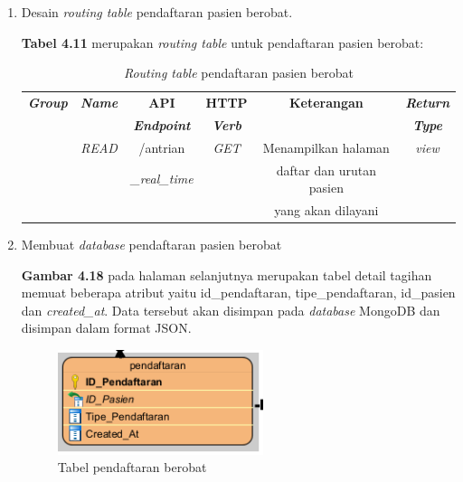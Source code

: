 \begin{enumerate}
	\item Desain \emph{routing table} pendaftaran pasien berobat. 
	
	\textbf{Tabel 4.11} merupakan \emph{routing table} untuk pendaftaran pasien berobat:
	
	\begin{table}[H]
		\centering
		\caption{\emph{Routing table} pendaftaran pasien berobat}
		\label{tabel_input}
		\begin{tabular}{|c|c|c|c|c|c|}
			\hline
			\textbf{\emph{Group}} & \textbf{\emph{Name}} & \textbf{API} & \textbf{HTTP} & \textbf{Keterangan} & \textbf{\emph{Return}} \\
			
			& & \textbf{\emph{Endpoint}} & \textbf{\emph{Verb}} & & \textbf{\emph{Type}} \\
			\hline
			
			& 
			\emph{READ} &
			/antrian&
			\emph{GET} &
			Menampilkan halaman&
			\emph{view}\\
			
			
			& 
			&
			\emph{\_real\_time}&
			&
			daftar dan urutan pasien&\\
			
			& 
			&
			&
			&
			yang akan dilayani &\\
			\hline
			
		\end{tabular}
	\end{table}
	
	\item Membuat \emph{database} pendaftaran pasien berobat
	
	\textbf{Gambar 4.18} pada halaman selanjutnya merupakan tabel detail tagihan memuat beberapa atribut yaitu id\_pendaftaran, tipe\_pendaftaran, id\_pasien dan \emph{created\_at}. Data tersebut akan disimpan pada \emph{database} MongoDB dan disimpan dalam format JSON.
	
	\begin{figure}[H]
		\centering
		\includegraphics[width=6cm]{gambar/Pendaftaran_database.png}
		\caption{Tabel pendaftaran berobat}
		\label{Gambar:pengelolaanantrian1}
	\end{figure}
	

\end{enumerate}
